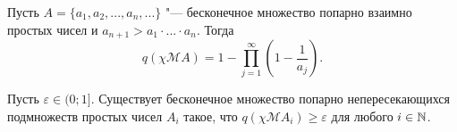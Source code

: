 	Пусть $A = \{a_1, a_2, ..., a_n,...\}$ "--- бесконечное множество попарно взаимно простых чисел
	и $a_{n+1}>a_1\cdot...\cdot a_n$.
	Тогда
	\begin{equation}
		q(\chi\mathscr{M}A) = 1-\prod_{j=1}^\infty \left(1-\frac{1}{a_j}\right)
		.
	\end{equation}

	Пусть $\varepsilon \in  (0; 1{]}$.
	Существует бесконечное множество попарно непересекающихся подмножеств простых чисел
	$A_i$ такое, что $q(\chi\mathscr{M}A_i)\geq\varepsilon$ для любого $i\in\mathbb{N}$.
